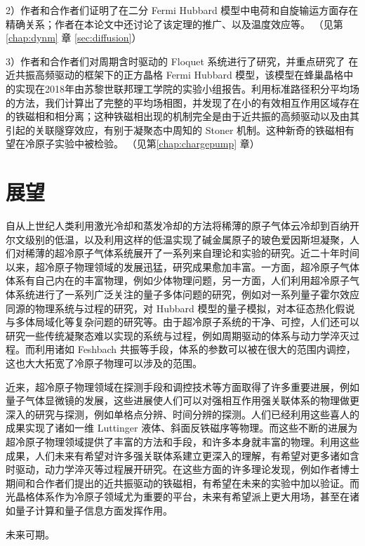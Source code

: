 2）作者和合作者们证明了在二分 Fermi Hubbard 模型中电荷和自旋输运方面存在精确关系；作者在本论文中还讨论了该定理的推广、以及温度效应等。
（见第\ref{chap:dynm} 章 \ref{sec:diffusion}）

3）作者和合作者们对周期含时驱动的 Floquet 系统进行了研究，并重点研究了
在近共振高频驱动的框架下的正方晶格 Fermi Hubbard 模型，该模型在蜂巢晶格中的实现在2018年由苏黎世联邦理工学院的实验小组报告\cite{correlated-tunnel-expr-2018-shaking}。利用标准路径积分平均场的方法，我们计算出了完整的平均场相图，并发现了在小的有效相互作用区域存在的铁磁相和相分离；这种铁磁相出现的机制完全是由于近共振的高频驱动以及由其引起的关联隧穿效应，有别于凝聚态中周知的 Stoner 机制。这种新奇的铁磁相有望在冷原子实验中被检验。
（见第\ref{chap:chargepump} 章）



\section{展望}

自从上世纪人类利用激光冷却和蒸发冷却的方法将稀薄的原子气体云冷却到百纳开尔文级别的低温，以及利用这样的低温实现了碱金属原子的玻色爱因斯坦凝聚\cite{bec1995a,bec1995b}，人们对稀薄的超冷原子气体系统展开了一系列来自理论和实验的研究。近二十年时间以来，超冷原子物理领域的发展迅猛，研究成果愈加丰富。一方面，超冷原子气体体系有自己内在的丰富物理，例如少体物理问题，另一方面，人们利用超冷原子气体系统进行了一系列广泛关注的量子多体问题的研究，例如对一系列量子霍尔效应同源的物理系统与过程的研究\cite{topo2016zoller,harper1,harper2,zak-expr-2013,chern-expr-2015,ab-expr-2015,wilsonline-expr-2016,haldane-expr-2014,charge-pump-expr-2016-de,charge-pump-expr-2016-jp,4dqhall-expr-2018}，对 Hubbard 模型的量子模拟\cite{hubbard-expan-2010,hubbard-expan-2012,microscope5,microscope6,af1,af2,af3,canted,incommensurate,af_long_range,pair_attractive,hidden_af_doped,charge-diffusion,spin-diffusion,floq-hubb-expr-2018,correlated-tunnel-expr-2018-shaking,correlated-tunnel-expr-2018-raman}，对本征态热化假说\cite{thermalize-entropy-2016}与多体局域化\cite{mbl1d,mbl2d}等复杂问题的研究等。由于超冷原子系统的干净、可控，人们还可以研究一些传统凝聚态难以实现的系统与过程，例如周期驱动的体系\cite{haldane-expr-2014,floq-hubb-expr-2018,correlated-tunnel-expr-2018-shaking}与动力学淬灭过程。而利用诸如 Feshbach 共振等手段，体系的参数可以被在很大的范围内调控，这也大大拓宽了冷原子物理可以涉及的范围。

近来，超冷原子物理领域在探测手段和调控技术等方面取得了许多重要进展，例如量子气体显微镜的发展，这些进展使人们可以对强相互作用强关联体系的物理做更深入的研究与探测，例如单格点分辨、时间分辨的探测。人们已经利用这些喜人的成果实现了诸如一维 Luttinger 液体\cite{hidden_af_doped}、斜面反铁磁序\cite{canted}等物理。而这些不断的进展为超冷原子物理领域提供了丰富的方法和手段，和许多本身就丰富的物理。利用这些成果，人们未来有希望对许多强关联体系建立更深入的理解，有希望对更多诸如含时驱动，动力学淬灭等过程展开研究。在这些方面的许多理论发现，例如作者博士期间和合作者们提出的近共振驱动的铁磁相\cite{floqhubb}，有希望在未来的实验中加以验证。而光晶格体系作为冷原子领域尤为重要的平台，未来有希望派上更大用场，甚至在诸如量子计算和量子信息方面发挥作用\cite{bloch2012}。

未来可期。